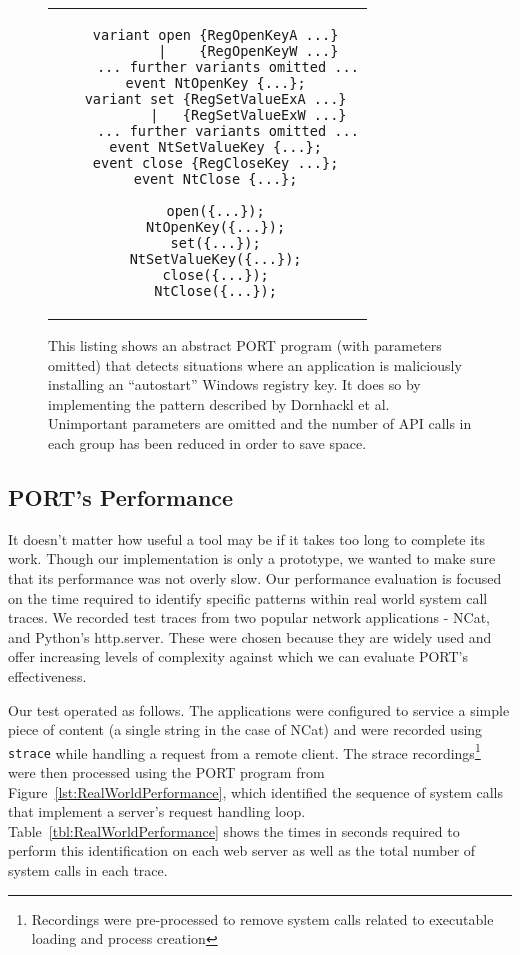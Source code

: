 \begin{figure}[H]
\centering
\begin{tabular}{c}
\begin{lstlisting}
  variant open {RegOpenKeyA ...}
          |    {RegOpenKeyW ...}
     ... further variants omitted ...
  event NtOpenKey {...};
  variant set {RegSetValueExA ...}
          |   {RegSetValueExW ...}
     ... further variants omitted ...
  event NtSetValueKey {...};
  event close {RegCloseKey ...};
  event NtClose {...};

  open({...});
  NtOpenKey({...});
  set({...});
  NtSetValueKey({...});
  close({...});
  NtClose({...});
\end{lstlisting}
\end{tabular}
  \caption{This listing shows an abstract PORT program (with parameters
  omitted) that detects situations where an application is maliciously
  installing an ``autostart'' Windows registry key.  It does so by
  implementing the pattern described by Dornhackl et al.  Unimportant
  parameters are omitted and the number of API calls in each group has been
  reduced in order to save space.}
\label{lst:PORTRegDetect}
\end{figure}


\subsection{PORT's Performance}

It doesn't matter how useful a tool may be
if it takes too long to complete its work.
Though our implementation is
only a prototype, we wanted to make sure that its performance was not
overly slow.
Our performance evaluation
is focused on the time required
to identify specific
patterns within real world system call traces.
We recorded test traces
from two popular network applications -
NCat,
and
Python's http.server.
These
were chosen because they are widely used and
offer increasing levels of complexity against which we can evaluate
PORT's effectiveness.

Our test operated as follows.  The applications were configured to service
a simple piece of content (a single string in the case of NCat) and were
recorded using {\tt strace} while handling a request from a remote client.
The strace
recordings\footnote{Recordings were pre-processed to remove system calls
related to executable loading and process creation} were then processed using the PORT program from
Figure~\ref{lst:RealWorldPerformance},  which
identified the sequence of system calls that implement
a server's request handling
loop.  Table~\ref{tbl:RealWorldPerformance}
shows the times in seconds required to perform this identification on each
web server as well as the total number of system calls in each trace.

